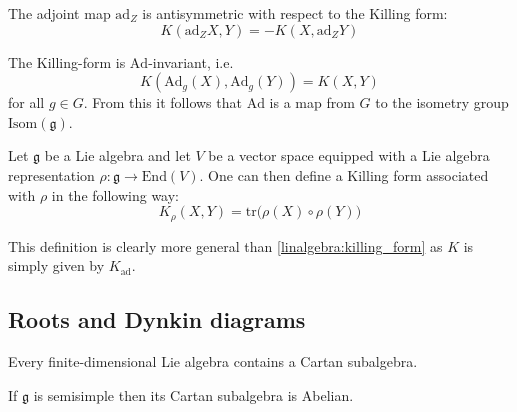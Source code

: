 	\begin{property}
		The adjoint map $\text{ad}_Z$ is antisymmetric with respect to the Killing form:
		\begin{equation}
			\label{lie:ad_killing_form}
			K(\text{ad}_ZX, Y) = -K(X, \text{ad}_ZY)
		\end{equation}
	\end{property}
	\begin{property}
		The Killing-form is $\text{Ad}$-invariant, i.e.
                \begin{equation}
                    K(\text{Ad}_g(X), \text{Ad}_g(Y)) = K(X, Y)
		\end{equation}
                for all $g\in G$. From this it follows that $\text{Ad}$ is a map from $G$ to the isometry group $\text{Isom}(\mathfrak{g})$.
	\end{property}
	
	\begin{definition}
		Let $\mathfrak{g}$ be a Lie algebra and let $V$ be a vector space equipped with a Lie algebra representation $\rho:\mathfrak{g}\rightarrow\text{End}(V)$. One can then define a Killing form associated with $\rho$ in the following way:
		\begin{equation}
			\label{lie:rho_killing_form}
			K_\rho(X, Y) = \text{tr}\Big(\rho(X)\circ\rho(Y)\Big)
		\end{equation}
	\end{definition}
	\begin{remark}
		This definition is clearly more general than \ref{linalgebra:killing_form} as $K$ is simply given by $K_{\text{ad}}$.
	\end{remark}

\subsection{Roots and Dynkin diagrams}

        
        \begin{property}
        	Every finite-dimensional Lie algebra contains a Cartan subalgebra.
        \end{property}
        \begin{property}
        	If $\mathfrak{g}$ is semisimple then its Cartan subalgebra is Abelian.
        \end{property}
        
